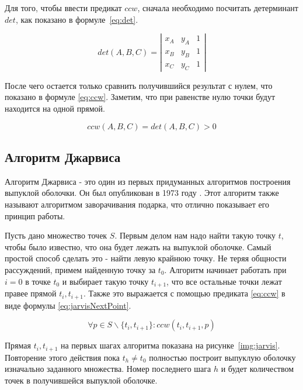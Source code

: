 Для того, чтобы ввести предикат $ccw$, сначала необходимо посчитать детерминант $det$, как показано в формуле~\eqref{eq:det}.

\begin{equation}\label{eq:det}
det(A, B, C)= \left| \begin{array}{ccc} x_A & y_A & 1 \\ x_B & y_B & 1 \\ x_C & y_C & 1  \end{array}\right|
\end{equation}

После чего остается только сравнить получившийся результат с нулем, что показано в формуле \eqref{eq:ccw}. Заметим, что при равенстве нулю точки будут находится на одной прямой.

\begin{equation}\label{eq:ccw}
ccw(A, B, C)=det(A, B, C) > 0
\end{equation}


\subsection{Алгоритм Джарвиса} \label{subsect1_1_1}

Алгоритм Джарвиса - это один из первых придуманных алгоритмов построения выпуклой оболочки. Он был опубликован в 1973 году \cite{jarvis1973Jarvis}. Этот алгоритм также называют алгоритмом заворачивания подарка, что отлично показывает его принцип работы.

Пусть дано множество точек $S$. Первым делом нам надо найти такую точку $t$, чтобы было известно, что она будет лежать на выпуклой оболочке. Самый простой способ сделать это - найти левую крайнюю точку. Не теряя общности рассуждений, примем найденную точку за $t_0$. Алгоритм начинает работать при $i=0$ в точке $t_0$ и выбирает такую точку $t_{i+1}$, что все остальные точки лежат правее прямой $t_i, t_{i+1}$. Также это выражается с помощью предиката \eqref{eq:ccw} в виде формулы \eqref{eq:jarvisNextPoint}.

\begin{equation}\label{eq:jarvisNextPoint}
\forall p \in S \backslash \{t_i, t_{i+1}\} : ccw(t_i, t_{i+1}, p)
\end{equation}

Прямая $t_i, t_{i+1}$ на первых шагах алгоритма показана на рисунке~\ref{img:jarvis}. Повторение этого действия пока $t_h \neq t_0$ полностью построит выпуклую оболочку изначально заданного множества. Номер последнего шага $h$ и будет количеством точек в получившейся выпуклой оболочке.

